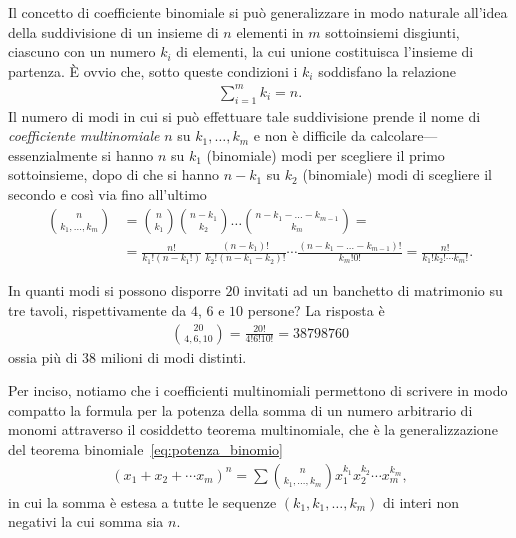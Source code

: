 \danger%
Il concetto di coefficiente binomiale si può generalizzare in modo naturale
all'idea della suddivisione di un insieme di $n$ elementi in $m$ sottoinsiemi
disgiunti, ciascuno con un numero $k_i$ di elementi, la cui unione
costituisca l'insieme di partenza. \`E ovvio che, sotto queste condizioni
i $k_i$ soddisfano la relazione
\begin{align*}
  \sum_{i = 1}^m k_i = n.
\end{align*}
Il numero di modi in cui si può effettuare tale suddivisione prende il nome
di \emph{coefficiente multinomiale} $n$ su $k_1, \ldots, k_m$ e non è
difficile da calcolare---essenzialmente si hanno $n$ su $k_1$ (binomiale) modi
per scegliere il primo sottoinsieme, dopo di che si hanno $n-k_1$ su $k_2$
(binomiale) modi di scegliere il secondo e così via fino all'ultimo
\begin{align}
  \binom{n}{k_1,\ldots,k_m} & =
  \binom{n}{k_1} \binom{n-k_1}{k_2} \ldots \binom{n-k_1-\ldots-k_{m-1}}{k_m} =
  \nonumber\\
  & = \frac{n!}{k_1!(n-k_1!)} \, \frac{(n-k_1)!}{k_2!(n-k_1-k_2)!} \cdots
  \frac{(n-k_1-\ldots-k_{m-1})!}{k_m!0!} = \frac{n!}{k_1!k_2! \cdots k_m!}.
\end{align}

\begin{examplebox}
  \begin{example}
    In quanti modi si possono disporre $20$ invitati ad un banchetto di
    matrimonio su tre tavoli, rispettivamente da $4$, $6$ e $10$ persone?
    La risposta è
    \begin{align*}
      \binom{20}{4,6,10} = \frac{20!}{4!6!10!} = 38798760
    \end{align*}
    ossia più di $38$ milioni di modi distinti.
  \end{example}
\end{examplebox}

Per inciso, notiamo che i coefficienti multinomiali permettono di scrivere in
modo compatto la formula per la potenza della somma di un numero arbitrario
di monomi attraverso il cosiddetto teorema multinomiale, che è la
generalizzazione del teorema binomiale~\eqref{eq:potenza_binomio}
\begin{align}
  (x_1 + x_2 + \cdots x_m)^n =
  \sum \binom{n}{k_1,\ldots,k_m} x_1^{k_1} x_2^{k_2} \cdots x_m^{k_m},
\end{align}
in cui la somma è estesa a tutte le sequenze $(k_1, k_1,\ldots,k_m)$ di interi
non negativi la cui somma sia $n$.



